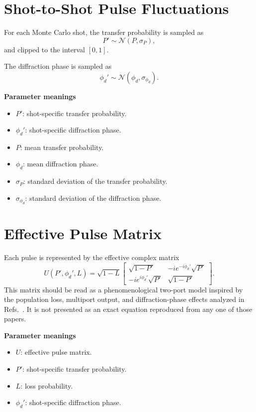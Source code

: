 \documentclass[11pt,a4paper]{article}
\begin{document}
\section{Shot-to-Shot Pulse Fluctuations}

For each Monte Carlo shot, the transfer probability is sampled as
\begin{equation}
  P' \sim \mathcal{N}(P,\sigma_P),
\end{equation}
and clipped to the interval $[0,1]$.

The diffraction phase is sampled as
\begin{equation}
  \phi_d' \sim \mathcal{N}(\phi_d,\sigma_{\phi_d}).
\end{equation}

\textbf{Parameter meanings}
\begin{itemize}[leftmargin=1.5em]
  \item $P'$: shot-specific transfer probability.
  \item $\phi_d'$: shot-specific diffraction phase.
  \item $P$: mean transfer probability.
  \item $\phi_d$: mean diffraction phase.
  \item $\sigma_P$: standard deviation of the transfer probability.
  \item $\sigma_{\phi_d}$: standard deviation of the diffraction phase.
\end{itemize}

\section{Effective Pulse Matrix}

Each pulse is represented by the effective complex matrix
\begin{equation}
  U(P',\phi_d',L) =
  \sqrt{1-L}
  \begin{bmatrix}
    \sqrt{1-P'} & -i e^{-i\phi_d'} \sqrt{P'} \\
    -i e^{i\phi_d'} \sqrt{P'} & \sqrt{1-P'}
  \end{bmatrix}.
\end{equation}
This matrix should be read as a phenomenological two-port model inspired by the population loss, multiport output, and diffraction-phase effects analyzed in Refs.~\cite{Muller2008,Estey2015,Parker2016,Jenewein2022}. It is not presented as an exact equation reproduced from any one of those papers.

\textbf{Parameter meanings}
\begin{itemize}[leftmargin=1.5em]
  \item $U$: effective pulse matrix.
  \item $P'$: shot-specific transfer probability.
  \item $L$: loss probability.
  \item $\phi_d'$: shot-specific diffraction phase.
\end{itemize}
\end{document}
